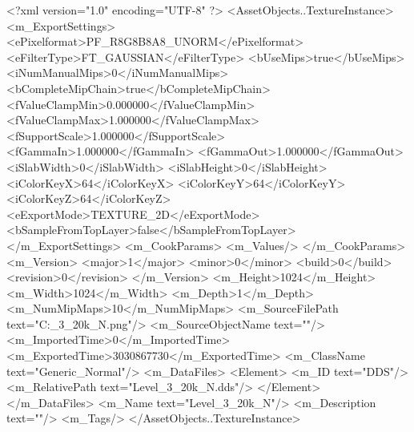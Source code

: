 <?xml version="1.0" encoding="UTF-8" ?>
<AssetObjects..TextureInstance>
	<m_ExportSettings>
		<ePixelformat>PF_R8G8B8A8_UNORM</ePixelformat>
		<eFilterType>FT_GAUSSIAN</eFilterType>
		<bUseMips>true</bUseMips>
		<iNumManualMips>0</iNumManualMips>
		<bCompleteMipChain>true</bCompleteMipChain>
		<fValueClampMin>0.000000</fValueClampMin>
		<fValueClampMax>1.000000</fValueClampMax>
		<fSupportScale>1.000000</fSupportScale>
		<fGammaIn>1.000000</fGammaIn>
		<fGammaOut>1.000000</fGammaOut>
		<iSlabWidth>0</iSlabWidth>
		<iSlabHeight>0</iSlabHeight>
		<iColorKeyX>64</iColorKeyX>
		<iColorKeyY>64</iColorKeyY>
		<iColorKeyZ>64</iColorKeyZ>
		<eExportMode>TEXTURE_2D</eExportMode>
		<bSampleFromTopLayer>false</bSampleFromTopLayer>
	</m_ExportSettings>
	<m_CookParams>
		<m_Values/>
	</m_CookParams>
	<m_Version>
		<major>1</major>
		<minor>0</minor>
		<build>0</build>
		<revision>0</revision>
	</m_Version>
	<m_Height>1024</m_Height>
	<m_Width>1024</m_Width>
	<m_Depth>1</m_Depth>
	<m_NumMipMaps>10</m_NumMipMaps>
	<m_SourceFilePath text="C:\Users\Shadow\Desktop\Prototypes\Level_3_20k_N.png"/>
	<m_SourceObjectName text=""/>
	<m_ImportedTime>0</m_ImportedTime>
	<m_ExportedTime>3030867730</m_ExportedTime>
	<m_ClassName text="Generic_Normal"/>
	<m_DataFiles>
		<Element>
			<m_ID text="DDS"/>
			<m_RelativePath text="Level_3_20k_N.dds"/>
		</Element>
	</m_DataFiles>
	<m_Name text="Level_3_20k_N"/>
	<m_Description text=""/>
	<m_Tags/>
</AssetObjects..TextureInstance>

